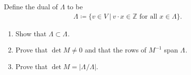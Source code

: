 Define the dual of \(\Lambda\) to be
\begin{align*}
\Lambda  {}^{ \check{} }\coloneqq\{v \in V {~\mathrel{\Big|}~}v \cdot x \in {\mathbb{Z}}\text{ for all } x \in \Lambda
\}
.\end{align*}

\begin{enumerate}
\def\labelenumi{\alph{enumi}.}
\item
  Show that \(\Lambda \subset \Lambda {}^{ \check{} }\).
\item
  Prove that \(\det M \neq 0\) and that the rows of \(M^{-1}\) span
  \(\Lambda {}^{ \check{} }\).
\item
  Prove that \(\det M = |\Lambda {}^{ \check{} }/\Lambda|\).
\end{enumerate}


